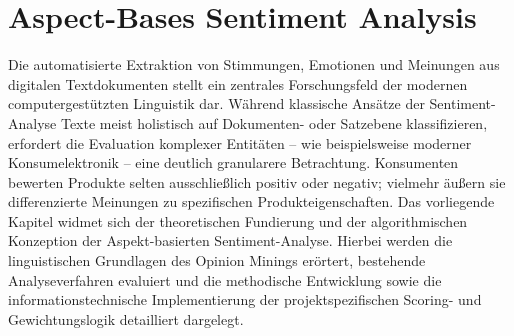 \documentclass[12pt]{article}
\begin{document}
\section{Aspect-Bases Sentiment Analysis}
Die automatisierte Extraktion von Stimmungen, Emotionen und Meinungen aus digitalen Textdokumenten stellt ein zentrales Forschungsfeld der modernen computergestützten Linguistik dar. Während klassische Ansätze der Sentiment-Analyse Texte meist holistisch auf Dokumenten- oder Satzebene klassifizieren, erfordert die Evaluation komplexer Entitäten – wie beispielsweise moderner Konsumelektronik – eine deutlich granularere Betrachtung. Konsumenten bewerten Produkte selten ausschließlich positiv oder negativ; vielmehr äußern sie differenzierte Meinungen zu spezifischen Produkteigenschaften. Das vorliegende Kapitel widmet sich der theoretischen Fundierung und der algorithmischen Konzeption der Aspekt-basierten Sentiment-Analyse. Hierbei werden die linguistischen Grundlagen des Opinion Minings erörtert, bestehende Analyseverfahren evaluiert und die methodische Entwicklung sowie die informationstechnische Implementierung der projektspezifischen Scoring- und Gewichtungslogik detailliert dargelegt.
\end{document}
